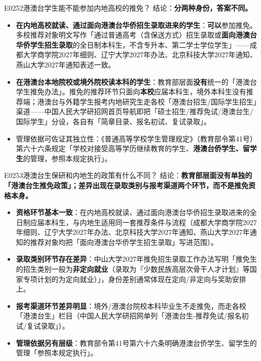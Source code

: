 \begin{qa}{E0252}{港澳台学生能不能参加内地高校的推免？}
结论：\textbf{分两种身份，答案不同。}
\begin{itemize}
  \item \textbf{在内地高校就读、通过面向港澳台华侨招生录取进来的学生}：\textbf{可以}参加推免。多校推荐对象明文写作「通过普通高考（含保送方式）招生录取或\textbf{面向港澳台华侨学生招生录取}的全日制本科生，不含专升本、第二学士学位学生」——成都大学商学院2027年细则、辽宁大学2027年办法、北京科技大学2027年通知、燕山大学2027年通知表述一致。
  \item \textbf{在港澳台本地院校或境外院校读本科的学生}：教育部层面\textbf{没有}统一的「港澳台学生推免办法」。推免的推荐环节只面向\textbf{本校}应届本科生，境外本科生没有推荐端；港澳台与外籍学生报考内地研究生走各校「港澳台招生/国际学生招生」渠道——中国人民大学研招网首页导航即把「硕士招生/推荐免试/港澳台生/国际学生」分设，各自有「简章目录、报名初试、复试录取」。
  \item 管理依据可佐证其独立性：《普通高等学校学生管理规定》（教育部令第41号）第六十六条规定「学校对接受高等学历继续教育的学生、\textbf{港澳台侨学生、留学生}的管理，参照本规定执行」。
\end{itemize}
\end{qa}

\begin{qa}{E0253}{港澳台生保研和内地生的政策有什么不同？}
结论：\textbf{教育部层面没有单独的「港澳台生推免政策」；差异出现在录取类别与报考渠道两个环节，而不是推免资格本身。}
\begin{itemize}
  \item \textbf{资格环节基本一致}：在内地高校就读、通过面向港澳台华侨招生录取进来的全日制应届本科生，与内地生适用同一套推荐条件与流程（成都大学商学院2027年细则、辽宁大学2027年办法、北京科技大学2027年通知、燕山大学2027年通知的推荐对象均把「面向港澳台华侨学生招生录取」写进范围）。
  \item \textbf{录取类别环节存在差异}：中山大学2027年推免招生录取工作办法写明「推免生的招生类别一般为\textbf{非定向就业}（录取为『少数民族高层次骨干人才计划』等国家专项计划的为定向就业）」，身份差别通常体现在定向/非定向与奖助安排上。
  \item \textbf{报考渠道环节差异明显}：境外/港澳台院校本科毕业生不走推免，而走各校「港澳台生」栏目（中国人民大学研招网单列「港澳台生-推荐免试/报名初试/复试录取」）。
  \item \textbf{管理依据另有层级}：教育部令第41号第六十六条明确港澳台侨学生、留学生的管理「参照本规定执行」。
\end{itemize}
\end{qa}

